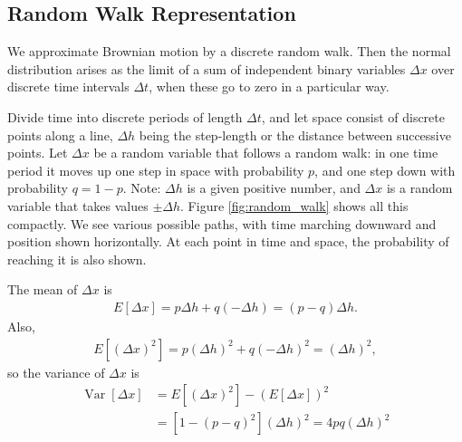 \documentclass[\topdir/lecture\_notes.tex]{subfiles}
\begin{document}
\subsection{Random Walk Representation}
We approximate Brownian motion by a discrete random walk. Then the normal distribution arises as the limit of a sum
of independent binary variables \(\Delta x\) over discrete time intervals \(\Delta t\), when these go to zero in a particular way.

Divide time into discrete periods of length \(\Delta t\), and let space consist of discrete points along a line, \(\Delta h\) being the step-length or the distance between successive points. Let \(\Delta x\) be a random variable that follows a random walk: in one time period it moves up one step in space with probability \(p\), and one step down with probability \(q=1-p\). Note: \(\Delta h\) is a given positive number, and \(\Delta x\) is a random variable that takes values \(\pm \Delta h\). Figure \ref{fig:random_walk} shows all this compactly. We see various possible paths, with time marching downward and position shown horizontally. At each point in time and space, the probability of reaching it is also shown.

The mean of \(\Delta x\) is
\begin{align}
    E[\Delta x]=p \Delta h+q(-\Delta h)=(p-q) \Delta h.
\end{align}
Also,
\begin{align*}
    E\left[(\Delta x)^{2}\right]=p(\Delta h)^{2}+q(-\Delta h)^{2}=(\Delta h)^{2},
\end{align*}
so the variance of \(\Delta x\) is
\begin{align}
    \operatorname{Var}[\Delta x] & =E\left[(\Delta x)^{2}\right]-(E[\Delta x])^{2} \\
    & =\left[1-(p-q)^{2}\right](\Delta h)^{2}=4 p q(\Delta h)^{2}
\end{align}
\end{document}
